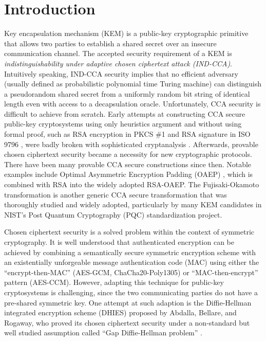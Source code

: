 \documentclass[runningheads]{llncs}
\begin{document}
\section{Introduction}\label{sec:introduction}
Key encapsulation mechanism (KEM) is a public-key cryptographic primitive that allows two parties to establish a shared secret over an insecure communication channel. The accepted security requirement of a KEM is \textit{indistinguishability under adaptive chosen ciphertext attack (IND-CCA)}. Intuitively speaking, IND-CCA security implies that no efficient adversary (usually defined as probabilistic polynomial time Turing machine) can distinguish a pseudorandom shared secret from a uniformly random bit string of identical length even with access to a decapsulation oracle. Unfortunately, CCA security is difficult to achieve from scratch. Early attempts at constructing CCA secure public-key cryptosystems using only heuristics argument and without using formal proof, such as RSA encryption in PKCS \#1 \cite{DBLP:journals/rfc/rfc2313} and RSA signature in ISO 9796 \cite{ISO9796-1}, were badly broken with sophisticated cryptanalysis \cite{DBLP:conf/crypto/Bleichenbacher98,DBLP:conf/eurocrypt/Grieu00,DBLP:conf/crypto/CoronNS99}. Afterwards, provable chosen ciphertext security became a necessity for new cryptographic protocols. There have been many provable CCA secure constructions since then. Notable examples include Optimal Asymmetric Encryption Padding (OAEP) \cite{DBLP:conf/eurocrypt/BellareR94}, which is combined with RSA \cite{DBLP:conf/crypto/FujisakiOPS01} into the widely adopted RSA-OAEP. The Fujisaki-Okamoto transformation \cite{DBLP:conf/crypto/FujisakiO99,DBLP:conf/tcc/HofheinzHK17} is another generic CCA secure transformation that was thoroughly studied and widely adopted, particularly by many KEM candidates in NIST's Post Quantum Cryptography (PQC) standardization project.

Chosen ciphertext security is a solved problem within the context of symmetric cryptography. It is well understood that authenticated encryption can be achieved by combining a semantically secure symmetric encryption scheme with an existentially unforgeable message authentication code (MAC) using either the ``encrypt-then-MAC'' (AES-GCM, ChaCha20-Poly1305) or ``MAC-then-encrypt'' pattern (AES-CCM)\cite{DBLP:conf/asiacrypt/BellareN00,DBLP:conf/crypto/Krawczyk01}. However, adapting this technique for public-key cryptosystems is challenging, since the two communicating parties do not have a pre-shared symmetric key. One attempt at such adaption is the Diffie-Hellman integrated encryption scheme (DHIES) \cite{DBLP:journals/iacr/AbdallaBR99,DBLP:conf/ctrsa/AbdallaBR01} proposed by Abdalla, Bellare, and Rogaway, who proved its chosen ciphertext security under a non-standard but well studied assumption called ``Gap Diffie-Hellman problem'' \cite{DBLP:conf/pkc/OkamotoP01}.
\end{document}
